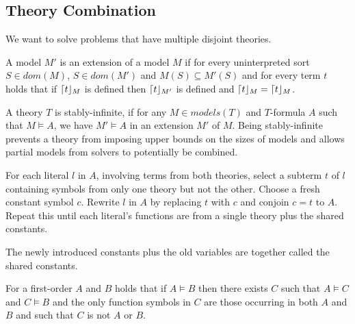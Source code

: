 \subsection{Theory Combination}
\begin{mytitle} We want to solve problems that have multiple disjoint theories.
\end{mytitle}
\begin{mytitle}[Extension] A model $M'$ is an extension of a model $M$ if for every uninterpreted sort $S\in dom(M)$, $S\in dom(M')$ and $M(S) \subseteq M'(S)$ and for every term $t$ holds that if $\lceil t\rfloor_{M}$ is defined then $\lceil t\rfloor_{M'}$ is defined and $\lceil t\rfloor_{M} = \lceil t\rfloor_{M}$.
\end{mytitle}
\begin{mytitle} A theory $T$ is stably-infinite, if for any $M\in models(T)$ and $T$-formula $A$ such that $M\models A$, we have $M'\models A$ in an extension $M'$ of $M$. Being stably-infinite  prevents a theory from imposing upper bounds on the sizes of models and allows partial models from solvers to potentially be combined.
\end{mytitle}
\begin{mytitle}[Purification] For each literal $l$ in $A$, involving terms from both theories, select a subterm $t$ of $l$ containing symbols from only one theory but not the other. Choose a fresh constant symbol $c$. Rewrite $l$ in $A$ by replacing $t$ with $c$ and conjoin $c=t$ to $A$. Repeat this until each literal's functions are from a single theory plus the shared constants. 
    \begin{mysubtitle} The newly introduced constants plus the old variables are together called the shared constants.
    \end{mysubtitle}
\end{mytitle}
\begin{mytitle} For a first-order $A$ and $B$ holds that if $A\models B$ then there exists $C$ such that $A\models C$ and $C\models B$ and the only function symbols in $C$ are those occurring in both $A$ and $B$ and such that $C$ is not $A$ or $B$.
\end{mytitle}
